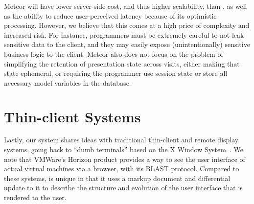 Meteor will have lower server-side cost, and thus higher scalability, than \cb, as well
as the ability to reduce user-perceived latency because of its optimistic processing.
However, we believe that this comes at a high price of complexity and increased risk.
For instance, programmers must be extremely careful to not leak sensitive data to the 
client, and they may easily expose (unintentionally) sensitive business logic to the client.  
Meteor also does not focus on the problem of simplifying the retention of presentation
state across visits, either making that state ephemeral, or requiring the programmer
use session state or store all necessary model variables in the database.

\section{Thin-client Systems}

Lastly, our system shares ideas with traditional thin-client and remote display 
systems, going back to ``dumb terminals'' based on the X Window 
System~\cite{ScheiflerGettys:acmtg1986}.  We note that VMWare's Horizon product provides
a way to see the user interface of actual virtual machines via a browser, with its
BLAST protocol.  Compared to these systems, \cb{} is 
unique in that it uses a markup document and differential update to it to 
describe the structure and evolution of the user interface that is rendered 
to the user.  
